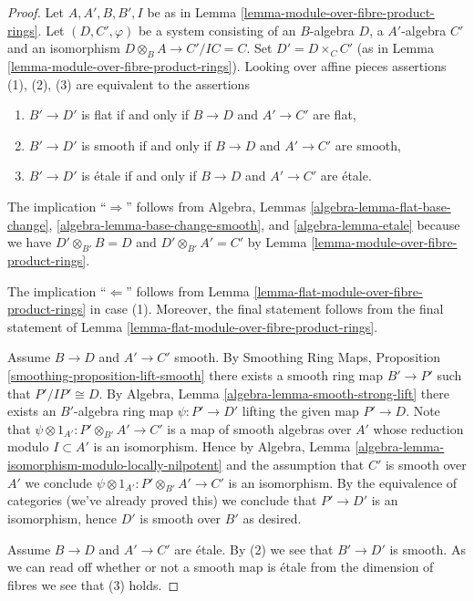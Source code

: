 \begin{proof}
Let $A, A', B, B', I$ be as in
Lemma \ref{lemma-module-over-fibre-product-rings}.
Let $(D, C', \varphi)$ be a system consisting of an $B$-algebra $D$,
a $A'$-algebra $C'$ and an isomorphism $D \otimes_B A \to C'/IC = C$.
Set $D' = D \times_C C'$ (as in
Lemma \ref{lemma-module-over-fibre-product-rings}).
Looking over affine pieces assertions (1), (2), (3)
are equivalent to the assertions
\begin{enumerate}
\item $B' \to D'$ is flat if and only if $B \to D$ and $A' \to C'$ are flat,
\item $B' \to D'$ is smooth if and only if $B \to D$ and $A' \to C'$ are smooth,
\item $B' \to D'$ is \'etale if and only if $B \to D$ and $A' \to C'$
are \'etale.
\end{enumerate}
The implication ``$\Rightarrow$'' follows from
Algebra, Lemmas \ref{algebra-lemma-flat-base-change},
\ref{algebra-lemma-base-change-smooth}, and
\ref{algebra-lemma-etale} because we have
$D' \otimes_{B'} B = D$ and $D' \otimes_{B'} A' = C'$
by Lemma \ref{lemma-module-over-fibre-product-rings}.

\medskip\noindent
The implication ``$\Leftarrow$'' follows from
Lemma \ref{lemma-flat-module-over-fibre-product-rings}
in case (1). Moreover, the final statement follows from the final
statement of Lemma \ref{lemma-flat-module-over-fibre-product-rings}.

\medskip\noindent
Assume $B \to D$ and $A' \to C'$ smooth.
By Smoothing Ring Maps, Proposition \ref{smoothing-proposition-lift-smooth}
there exists a smooth ring map $B' \to P'$ such that $P'/IP' \cong D$.
By Algebra, Lemma \ref{algebra-lemma-smooth-strong-lift}
there exists an $B'$-algebra ring map $\psi : P' \to D'$
lifting the given map $P' \to D$. Note that
$\psi \otimes 1_{A'} :  P' \otimes_{B'} A' \to C'$
is a map of smooth algebras over $A'$ whose reduction modulo $I \subset A'$
is an isomorphism. Hence by
Algebra, Lemma \ref{algebra-lemma-isomorphism-modulo-locally-nilpotent}
and the assumption that $C'$ is smooth over $A'$ we conclude
$\psi \otimes 1_{A'} :  P' \otimes_{B'} A' \to C'$ is an isomorphism.
By the equivalence of categories (we've already proved this) we conclude
that $P' \to D'$ is an isomorphism, hence $D'$ is smooth over $B'$
as desired.

\medskip\noindent
Assume $B \to D$ and $A' \to C'$ are \'etale. By (2) we see that
$B' \to D'$ is smooth. As we can read off whether or not a smooth
map is \'etale from the dimension of fibres we see that (3) holds.
\end{proof}







